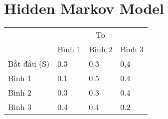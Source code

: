 \section{Hidden Markov Model}

\begin{center}
  \begin{table}[h]
    \begin{tabular}{|l|l|l|l|}
    \hline
    \multicolumn{1}{|c|}{\multirow{2}{*}{}} & \multicolumn{3}{c|}{To} \\ \cline{2-4} 
    \multicolumn{1}{|c|}{}                  & Bình 1 & Bình 2 & Bình 3 \\ \hline
    Bắt đầu (S)                             & 0.3    & 0.3    & 0.4    \\ \hline
    Bình 1                                  & 0.1    & 0.5    & 0.4    \\ \hline
    Bình 2                                  & 0.3    & 0.3    & 0.4    \\ \hline
    Bình 3                                  & 0.4    & 0.4    & 0.2    \\ \hline
    \end{tabular}
  \end{table}
\end{center}


